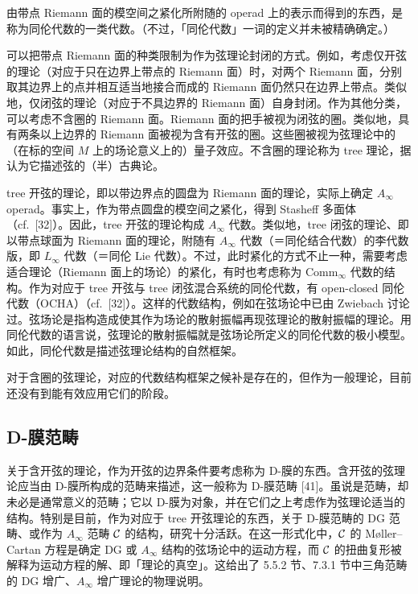 由带点 Riemann 面的模空间之紧化所附随的 operad 上的表示而得到的东西，是称为同伦代数的一类代数。（不过，「同伦代数」一词的定义并未被精确确定。）

可以把带点 Riemann 面的种类限制为作为弦理论封闭的方式。例如，考虑仅开弦的理论（对应于只在边界上带点的 Riemann 面）时，对两个 Riemann 面，分别取其边界上的点并相互适当地接合而成的 Riemann 面仍然只在边界上带点。类似地，仅闭弦的理论（对应于不具边界的 Riemann 面）自身封闭。作为其他分类，可以考虑不含圈的 Riemann 面。Riemann 面的把手被视为闭弦的圈。类似地，具有两条以上边界的 Riemann 面被视为含有开弦的圈。这些圈被视为弦理论中的（在标的空间 $M$ 上的场论意义上的）量子效应。不含圈的理论称为 tree 理论，据认为它描述弦的（半）古典论。

tree 开弦的理论，即以带边界点的圆盘为 Riemann 面的理论，实际上确定 $A_\infty$ operad。事实上，作为带点圆盘的模空间之紧化，得到 Stasheff 多面体（cf.\ [32]）。因此，tree 开弦的理论构成 $A_\infty$ 代数。类似地，tree 闭弦的理论、即以带点球面为 Riemann 面的理论，附随有 $A_\infty$ 代数（＝同伦结合代数）的李代数版，即 $L_\infty$ 代数（＝同伦 Lie 代数）。不过，此时紧化的方式不止一种，需要考虑适合理论（Riemann 面上的场论）的紧化，有时也考虑称为 $\mathrm{Comm}_\infty$ 代数的结构。作为对应于 tree 开弦与 tree 闭弦混合系统的同伦代数，有 open-closed 同伦代数（OCHA）（cf.\ [32]）。这样的代数结构，例如在弦场论中已由 Zwiebach 讨论过。弦场论是指构造成使其作为场论的散射振幅再现弦理论的散射振幅的理论。用同伦代数的语言说，弦理论的散射振幅就是弦场论所定义的同伦代数的极小模型。如此，同伦代数是描述弦理论结构的自然框架。

对于含圈的弦理论，对应的代数结构框架之候补是存在的，但作为一般理论，目前还没有到能有效应用它们的阶段。


\subsection{D-膜范畴}

关于含开弦的理论，作为开弦的边界条件要考虑称为 D-膜的东西。含开弦的弦理论应当由 D-膜所构成的范畴来描述，这一般称为 D-膜范畴 [41]。虽说是范畴，却未必是通常意义的范畴；它以 D-膜为对象，并在它们之上考虑作为弦理论适当的结构。特别是目前，作为对应于 tree 开弦理论的东西，关于 D-膜范畴的 DG 范畴、或作为 $A_\infty$ 范畴 $\mathcal{C}$ 的结构，研究十分活跃。在这一形式化中，$\mathcal{C}$ 的 Møller–Cartan 方程是确定 DG 或 $A_\infty$ 结构的弦场论中的运动方程，而 $\mathcal{C}$ 的扭曲复形被解释为运动方程的解、即「理论的真空」。这给出了 5.5.2 节、7.3.1 节中三角范畴的 DG 增广、$A_\infty$ 增广理论的物理说明。

